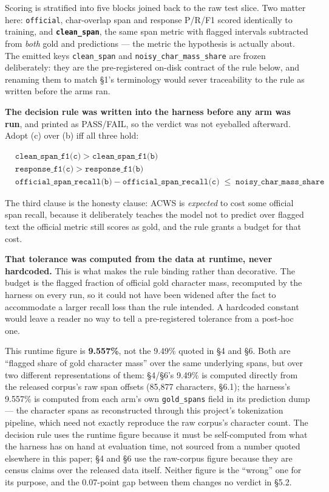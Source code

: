 \documentclass[11pt]{article}
\begin{document}
Scoring is stratified into five blocks joined back to the raw test slice. Two matter here:
\texttt{official}, char-overlap span and response P/R/F1 scored identically to training, and
\textbf{\texttt{clean\_span}}, the same span metric with flagged intervals subtracted from \emph{both} gold
and predictions --- the metric the hypothesis is actually about. The emitted keys \texttt{clean\_span}
and \texttt{noisy\_char\_mass\_share} are frozen deliberately: they are the pre-registered on-disk
contract of the rule below, and renaming them to match §1's terminology would sever
traceability to the rule as written before the arms ran.

\textbf{The decision rule was written into the harness before any arm was run}, and printed as
PASS/FAIL, so the verdict was not eyeballed afterward. Adopt (c) over (b) iff all three
hold:

\begin{align*}
&\texttt{clean\_span\_f1(c)} \;>\; \texttt{clean\_span\_f1(b)} \\
&\texttt{response\_f1(c)} \;>\; \texttt{response\_f1(b)} \\
&\texttt{official\_span\_recall(b)} - \texttt{official\_span\_recall(c)} \;\le\; \texttt{noisy\_char\_mass\_share}
\end{align*}

The third clause is the honesty clause: ACWS is \emph{expected} to cost some official span
recall, because it deliberately teaches the model not to predict over flagged text the
official metric still scores as gold, and the rule grants a budget for that cost.

\textbf{That tolerance was computed from the data at runtime, never hardcoded.} This is what
makes the rule binding rather than decorative. The budget is the flagged fraction of
official gold character mass, recomputed by the harness on every run, so it could not have
been widened after the fact to accommodate a larger recall loss than the rule intended. A
hardcoded constant would leave a reader no way to tell a pre-registered tolerance from a
post-hoc one.

This runtime figure is \textbf{9.557\%}, not the 9.49\% quoted in §4 and §6. Both are ``flagged
share of gold character mass'' over the same underlying spans, but over two different
representations of them: §4/§6's 9.49\% is computed directly from the released corpus's raw
span offsets (85,877 characters, §6.1); the harness's 9.557\% is computed from each arm's own
\texttt{gold\_spans} field in its prediction dump --- the character spans as reconstructed through this
project's tokenization pipeline, which need not exactly reproduce the raw corpus's character
count. The decision rule uses the runtime figure because it must be self-computed from what
the harness has on hand at evaluation time, not sourced from a number quoted elsewhere in this
paper; §4 and §6 use the raw-corpus figure because they are census claims over the released
data itself. Neither figure is the ``wrong'' one for its purpose, and the 0.07-point gap between
them changes no verdict in §5.2.
\end{document}
